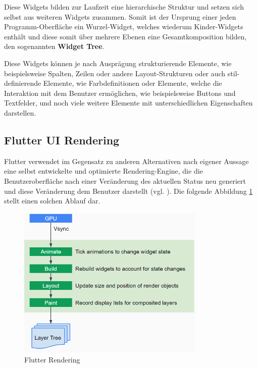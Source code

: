 \documentclass[bibliography=totoc,listof=totoc,BCOR=5mm,DIV=12,oneside]{scrbook}
\begin{document}
\par \medskip Diese Widgets bilden zur Laufzeit eine hierarchische Struktur und setzen sich selbst aus weiteren Widgets zusammen. Somit ist der Ursprung einer jeden Programm-Oberfläche ein Wurzel-Widget, welches wiederum Kinder-Widgets enthält und diese somit über mehrere Ebenen eine Gesamtkomposition bilden, den sogenannten \textbf{Widget Tree}. 

\par \medskip Diese Widgets können je nach Ausprägung strukturierende Elemente, wie beispielsweise Spalten, Zeilen oder andere Layout-Strukturen oder auch stil-definierende Elemente, wie Farbdefinitionen oder Elemente, welche die Interaktion mit dem Benutzer ermöglichen, wie beispielsweise Buttons und Textfelder, und noch viele weitere Elemente mit unterschiedlichen Eigenschaften darstellen.

\subsection{Flutter UI Rendering}
\par Flutter verwendet im Gegensatz zu anderen Alternativen nach eigener Aussage eine selbst entwickelte und optimierte Rendering-Engine, die die Benutzeroberfläche nach einer Veränderung des aktuellen Status neu generiert und diese Veränderung dem Benutzer darstellt (vgl. \citep[What makes Flutter unique?]{Flu3}). Die folgende Abbildung \ref{img:flutterHighLevelRendering} stellt einen solchen Ablauf dar.

\begin{figure}[H]
	\centering
	\includegraphics[width=0.8\textwidth, keepaspectratio]{Bilder/FlutterRendering.png}
	\caption{Flutter Rendering \cite{Flu5}}
	\label{img:flutterHighLevelRendering}
\end{figure}
\end{document}
